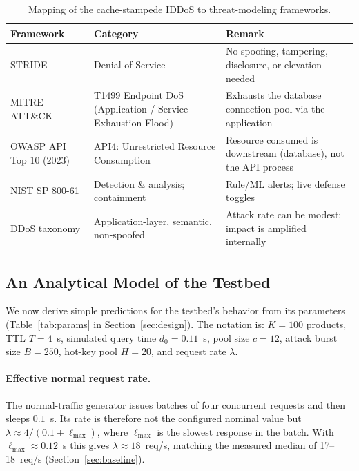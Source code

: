 \begin{table}[t]
\centering
\caption{Mapping of the cache-stampede IDDoS to threat-modeling frameworks.}
\label{tab:frameworks}
\small
\begin{tabularx}{\linewidth}{@{}L{3.2cm}L{4.4cm}Y@{}}
\toprule
Framework & Category & Remark \\
\midrule
STRIDE \cite{shostack2014} & Denial of Service & No spoofing, tampering, disclosure, or elevation needed \\
MITRE ATT\&CK \cite{mitret1499} & T1499 Endpoint DoS (Application / Service Exhaustion Flood) & Exhausts the database connection pool via the application \\
OWASP API Top 10 (2023) \cite{owaspapi2023} & API4: Unrestricted Resource Consumption & Resource consumed is downstream (database), not the API process \\
NIST SP 800-61 \cite{nist80061} & Detection \& analysis; containment & Rule/ML alerts; live defense toggles \\
DDoS taxonomy \cite{mirkovic2004} & Application-layer, semantic, non-spoofed & Attack rate can be modest; impact is amplified internally \\
\bottomrule
\end{tabularx}
\end{table}

\subsection{An Analytical Model of the Testbed}
\label{sec:model}
We now derive simple predictions for the testbed's behavior from its parameters
(Table~\ref{tab:params} in Section~\ref{sec:design}). The notation is: $K=100$ products,
TTL $T=4$~s, simulated query time $d_0=0.11$~s, pool size $c=12$, attack burst size
$B=250$, hot-key pool $H=20$, and request rate $\lambda$.

\paragraph{Effective normal request rate.} The normal-traffic generator issues
batches of four concurrent requests and then sleeps $0.1$~s. Its rate is therefore
not the configured nominal value but
$\lambda \approx 4/(0.1 + \ell_{\max})$, where $\ell_{\max}$ is the slowest response in
the batch. With $\ell_{\max}\approx0.12$~s this gives $\lambda\approx18$~req/s,
matching the measured median of 17--18~req/s (Section~\ref{sec:baseline}).

